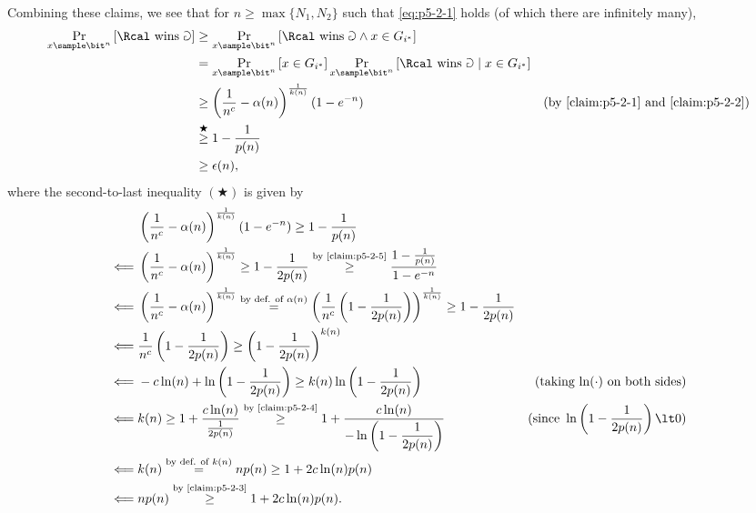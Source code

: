 \begin{answer}[ii]
    Combining these claims, we see that for $n\ge \max\{N_1,N_2\}$ such that \eqref{eq:p5-2-1} holds (of which there are infinitely many),
    \begin{align*}
        \Pr_{x\sample\bit^n}\left[\Rcal \textrm{ wins } \Game\right]
        &\ge \Pr_{x\sample\bit^n}\left[\Rcal \textrm{ wins } \Game \land x\in G_{i^\ast}\right]\\
        &=  \Pr_{x\sample\bit^n}\left[x\in G_{i^\ast}\right]\Pr_{x\sample\bit^n}\left[\Rcal \textrm{ wins } \Game \mid x\in G_{i^\ast}\right]\\
        &\ge \left(\frac{1}{n^c}-\alpha(n)\right)^{\frac{1}{k(n)}} (1-e^{-n})
        & \textrm{(by \autoref{claim:p5-2-1} and \autoref{claim:p5-2-2})}\\
        &\stackrel{\bigstar}{\ge} 1-\frac{1}{p(n)}\\
        &\ge \epsilon(n),
    \end{align*}
    where the second-to-last inequality $(\bigstar)$ is given by
    \begin{align*}
        &\left(\frac{1}{n^c}-\alpha(n)\right)^{\frac{1}{k(n)}} (1-e^{-n}) \ge 1-\frac{1}{p(n)}\\
        \impliedby& \left(\frac{1}{n^c}-\alpha(n)\right)^{\frac{1}{k(n)}} \ge 1-\dfrac{1}{2p(n)} \stackrel{\textrm{by \autoref{claim:p5-2-5}}}{\ge} \frac{1-\frac{1}{p(n)}}{1-e^{-n}}\\
        \impliedby& \left(\frac{1}{n^c}-\alpha(n)\right)^{\frac{1}{k(n)}} \stackrel{\textrm{by def. of } \alpha(n)}= \left(\frac{1}{n^c}\left(1-\frac{1}{2p(n)}\right)\right)^{\frac{1}{k(n)}}  \ge 1-\dfrac{1}{2p(n)} \\
        \impliedby& \frac{1}{n^c}\left(1-\frac{1}{2p(n)}\right)  \ge \left(1-\dfrac{1}{2p(n)} \right)^{k(n)} \\
        \impliedby& -c\ln(n) +\ln\left(1-\frac{1}{2p(n)}\right)  \ge k(n)\ln\left(1-\dfrac{1}{2p(n)} \right) 
        &(\textrm{taking $\ln(\cdot)$ on both sides})\\
        \impliedby& k(n)\ge  1+\frac{c\ln(n)}{\frac{1}{2p(n)}} \stackrel{\textrm{by \autoref{claim:p5-2-4}}}{\ge} 1+\frac{c\ln(n)}{-\ln\left(1-\dfrac{1}{2p(n)} \right)}
        &(\textrm{since }\ln\left(1-\dfrac{1}{2p(n)} \right) \lt 0)\\
        \impliedby& k(n)\stackrel{\textrm{by def. of } k(n)}{=}np(n)\ge 1+2c\ln(n)p(n) \\
        \impliedby& np(n)\stackrel{\textrm{by \autoref{claim:p5-2-3}}}{\ge} 1+2c\ln(n)p(n).
    \end{align*}


\end{answer}
